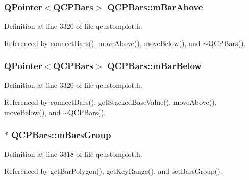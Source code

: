 \subsubsection[{m\+Bar\+Above}]{\setlength{\rightskip}{0pt plus 5cm}Q\+Pointer$<${\bf Q\+C\+P\+Bars}$>$ Q\+C\+P\+Bars\+::m\+Bar\+Above\hspace{0.3cm}{\ttfamily [protected]}}\label{class_q_c_p_bars_a0c1c46076c41a478dbb373cfd35929aa}


Definition at line 3320 of file qcustomplot.\+h.



Referenced by connect\+Bars(), move\+Above(), move\+Below(), and $\sim$\+Q\+C\+P\+Bars().

\hypertarget{class_q_c_p_bars_ad51db970eed7e286f2753b0216fc56de}{}
\subsubsection[{m\+Bar\+Below}]{\setlength{\rightskip}{0pt plus 5cm}Q\+Pointer$<${\bf Q\+C\+P\+Bars}$>$ Q\+C\+P\+Bars\+::m\+Bar\+Below\hspace{0.3cm}{\ttfamily [protected]}}\label{class_q_c_p_bars_ad51db970eed7e286f2753b0216fc56de}


Definition at line 3320 of file qcustomplot.\+h.



Referenced by connect\+Bars(), get\+Stacked\+Base\+Value(), move\+Above(), move\+Below(), and $\sim$\+Q\+C\+P\+Bars().

\hypertarget{class_q_c_p_bars_a9f59c255f3739182ca9744dff75beaa9}{}
\subsubsection[{m\+Bars\+Group}]{$\ast$ Q\+C\+P\+Bars\+::m\+Bars\+Group\hspace{0.3cm}{\ttfamily [protected]}}\label{class_q_c_p_bars_a9f59c255f3739182ca9744dff75beaa9}


Definition at line 3318 of file qcustomplot.\+h.



Referenced by get\+Bar\+Polygon(), get\+Key\+Range(), and set\+Bars\+Group().

